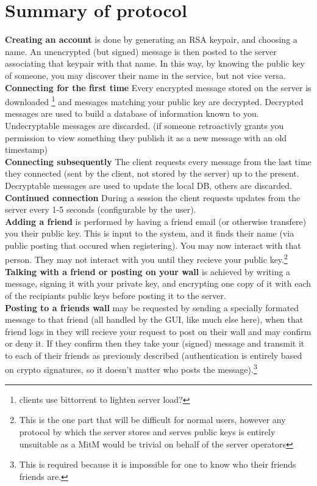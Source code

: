 \section{Summary of protocol} 
\textbf{Creating an account} is done by generating an RSA keypair, and choosing
a name. An unencrypted (but signed) message is then posted to the server
associating that keypair with that name. In this way, by knowing the public key
of someone, you may discover their name in the service, but not vice versa.\\
\textbf{Connecting for the first time} Every encrypted message stored on the
server is downloaded \footnote{clients use bittorrent to lighten server load?}
and messages matching your public key are decrypted. Decrypted messages are used
to build a database of information known to you. Undecryptable messages are
discarded. (if someone retroactivly grants you permission to view something
they publish it as a new message with an old timestamp)\\
\textbf{Connecting subsequently} The client requests every message from the last
time they connected (sent by the client, not stored by the server) up to the
present. Decryptable messages are used to update the local DB, others are
discarded.\\
\textbf{Continued connection} During a session the client requests updates from
the server every 1-5 seconds (configurable by the user).\\
\textbf{Adding a friend} is performed by having a friend email (or otherwise
transfere) you their public key. This is input to the system, and it finds their
name (via public posting that occured when registering). You may now interact
with that person. They may not interact with you until they recieve your public
key.\footnote{This is the one part that will be difficult for normal users,
however any protocol by which the server stores and serves public keys is
entirely unsuitable as a MitM would be trivial on behalf of the server
operators}\\
\textbf{Talking with a friend or posting on your wall} is achieved by writing
a message, signing it with your private key, and encrypting one copy of it with
each of the recipiants public keys before posting it to the server.\\
\textbf{Posting to a friends wall} may be requested by sending a specially
formated message to that friend (all handled by the GUI, like much else here),
when that friend logs in they will recieve your request to post on their wall
and may confirm or deny it. If they confirm then they take your (signed) message
and transmit it to each of their friends as previously described (authentication
is entirely based on crypto signatures, so it doesn't matter who posts the
message).\footnote{This is required because it is impossible for one to know who
their friends friends are.}

